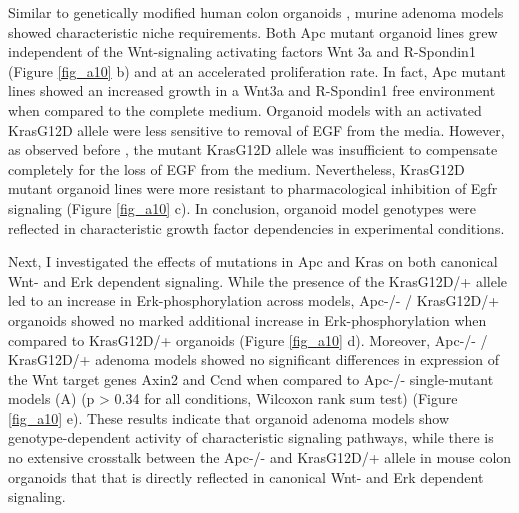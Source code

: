 \begin{flushleft}
Similar to genetically modified human colon organoids \cite{Drost2015-ph, Matano2015-zw}, murine adenoma models showed characteristic niche requirements. Both Apc mutant organoid lines grew independent of the Wnt-signaling activating factors Wnt 3a and R-Spondin1 (Figure \ref{fig_a10} b) and at an accelerated proliferation rate. In fact, Apc mutant lines showed an increased growth in a Wnt3a and R-Spondin1 free environment when compared to the complete medium. Organoid models with an activated KrasG12D allele were less sensitive to removal of EGF from the media. However, as observed before \cite{Drost2015-ph}, the mutant KrasG12D allele was insufficient to compensate completely for the loss of EGF from the medium. Nevertheless, KrasG12D mutant organoid lines were more resistant to pharmacological inhibition of Egfr signaling (Figure \ref{fig_a10} c). In conclusion, organoid model genotypes were reflected in characteristic growth factor dependencies in experimental conditions. 

\smallbreak
Next, I investigated the effects of mutations in Apc and Kras on both canonical Wnt- and Erk dependent signaling. While the presence of the KrasG12D/+ allele led to an increase in Erk-phosphorylation across models, Apc-/- / KrasG12D/+ organoids showed no marked additional increase in Erk-phosphorylation when compared to KrasG12D/+ organoids (Figure \ref{fig_a10} d). Moreover, Apc-/- / KrasG12D/+ adenoma models showed no significant differences in expression of the Wnt target genes Axin2 and Ccnd when compared to Apc-/- single-mutant models (A) (p > 0.34 for all conditions, Wilcoxon rank sum test) (Figure \ref{fig_a10} e). These results indicate that organoid adenoma models show genotype-dependent activity of characteristic signaling pathways, while there is no extensive crosstalk between the Apc-/-  and KrasG12D/+ allele in mouse colon organoids that that is directly reflected in canonical Wnt- and Erk dependent signaling.  

\bigbreak

\end{flushleft}
